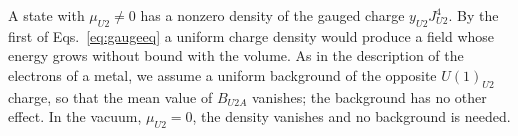 A state with $\mu_{U2}\neq0$ has a nonzero density of the gauged charge $y_{U2}J^4_{U2}$. By the
first of Eqs.~\eqref{eq:gaugeeq} a uniform charge density would produce a field whose energy grows
without bound with the volume. As in the description of the electrons of a metal, we assume a
uniform background of the opposite $U(1)_{U2}$ charge, so that the mean value of $B_{U2A}$
vanishes; the background has no other effect. In the vacuum, $\mu_{U2}=0$, the density vanishes
and no background is needed.
